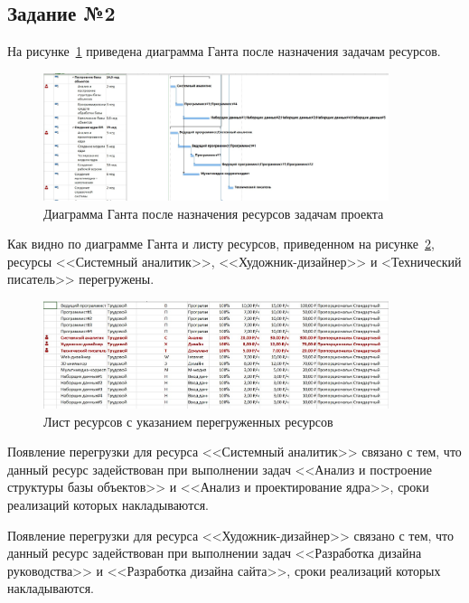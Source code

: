 \subsection{Задание №2}

На рисунке~\ref{fig:gant} приведена диаграмма Ганта после назначения задачам ресурсов.

\begin{figure}[H]
	\centering
	\includegraphics[width=0.9\textwidth]{img/lab2/task2/gant.jpg}
	\caption{Диаграмма Ганта после назначения ресурсов задачам проекта}
	\label{fig:gant}
\end{figure}

Как видно по диаграмме Ганта и листу ресурсов, приведенном на рисунке~\ref{fig:list_overflow}, ресурсы <<Системный аналитик>>, <<Художник-дизайнер>> и <Технический писатель>> перегружены.

\begin{figure}[H]
	\centering
	\includegraphics[width=0.9\textwidth]{img/lab2/task2/list.jpg}
	\caption{Лист ресурсов с указанием перегруженных ресурсов}
	\label{fig:list_overflow}
\end{figure}

Появление перегрузки для ресурса <<Системный аналитик>> связано с тем, что данный ресурс задействован при выполнении задач <<Анализ и построение структуры базы объектов>> и <<Анализ и проектирование ядра>>, сроки реализаций которых накладываются.

Появление перегрузки для ресурса <<Художник-дизайнер>> связано с тем, что данный ресурс задействован при выполнении задач <<Разработка дизайна руководства>> и <<Разработка дизайна сайта>>, сроки реализаций которых накладываются.

